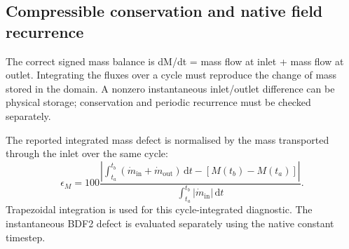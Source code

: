 \documentclass[11pt,a4paper]{article}
\begin{document}
\subsection{Compressible conservation and native field recurrence}
The correct signed mass balance is dM/dt = mass flow at inlet + mass flow at outlet. Integrating the fluxes over a cycle must reproduce the change of mass stored in the domain. A nonzero instantaneous inlet/outlet difference can be physical storage; conservation and periodic recurrence must be checked separately.\par

The reported integrated mass defect is normalised by the mass transported through the inlet over the same cycle:
\begin{equation}
\epsilon_M=100\frac{\left|\int_{t_a}^{t_b}(\dot m_{\mathrm{in}}+\dot m_{\mathrm{out}})\,\mathrm{d}t-[M(t_b)-M(t_a)]\right|}{\int_{t_a}^{t_b}|\dot m_{\mathrm{in}}|\,\mathrm{d}t}.
\end{equation}
Trapezoidal integration is used for this cycle-integrated diagnostic. The instantaneous BDF2 defect is evaluated separately using the native constant timestep.\par
\end{document}
